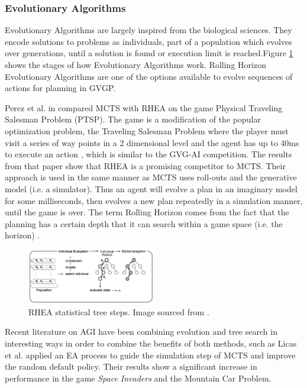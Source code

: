 \documentclass[journal]{IEEEtran}
\begin{document}
		



		\subsubsection{Evolutionary Algorithms} \label{sssec:EA}
			Evolutionary Algorithms are largely inspired from the biological sciences. They encode solutions to problems as individuals, part of a population which evolves over generations, until a solution is found or execution limit is reached.Figure \ref{fig:RHEArollout} shows the stages of how Evolutionary Algorithms work.
			Rolling Horizon Evolutionary Algorithms are one of the options available to evolve sequences of actions for planning in GVGP.

			Perez et al. in \cite{perez2013rolling} compared MCTS with RHEA on the game Physical Traveling Salesman Problem (PTSP). The game is a modification of the popular optimization problem, the Traveling Salesman Problem \cite{flood1956traveling} where the player must visit a series of way points in a 2 dimensional level and the agent has up to 40ms to execute an action \cite{perez2013rolling}, which is similar to the GVG-AI competition.  The results from that paper show that RHEA is a promising competitor to MCTS.
			Their approach is used in the same manner as MCTS uses roll-outs and the generative model (i.e. a simulator). Thus an agent will evolve a plan in an imaginary model for some milliseconds, then evolves a new plan repeatedly in a simulation manner, until the game is over.
			The term Rolling Horizon comes from the fact  that the planning has a certain depth that it can search within a game space  (i.e. the horizon) \cite{gaina2017analysis, gaina2017rolling}.
			

			\begin{figure}[h]
		   		 \centering
		   		 \includegraphics[width=0.5\textwidth]{RHEArollout}
		    		 \caption{RHEA statistical tree steps. Image sourced from \cite{gaina2017rolling}. }
		  		 \label{fig:RHEArollout}
			\end{figure}


			Recent literature on AGI have been combining evolution and tree search in interesting ways in order to combine the benefits of both methods, such as Licas et al. \cite{lucas2014fast} applied an EA process to guide the simulation step of MCTS and improve the random default policy. Their results show a significant increase in performance in the game \textit{Space Invaders} and the Mountain Car Problem.
			
\end{document}
